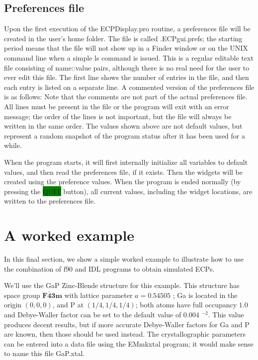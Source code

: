 \documentclass[DIV=calc, paper=letter, fontsize=11pt]{scrartcl}	 %
\newcommand{\button}[1]{\colorbox{green}{\textsf{#1}} button}
\begin{document}
\subsection{Preferences file\label{sec:idlpref}}
Upon the first execution of the \textsf{ECPDisplay.pro} routine, a preferences file will be created in the user's home folder.  
The file is called \textsf{.ECPgui.prefs}; the starting period
means that the file will not show up in a Finder window or on the UNIX command line when a simple \textsf{ls} command is issued.  This is a 
regular editable text file consisting of name::value pairs, although there is no real
need for the user to ever edit this file.  The first line shows the number of entries in the file, and then each entry is listed on a 
separate line.  A commented version of the preferences file is as follows:
Note that the comments are not part of the actual preferences file.  All lines must be present in the file or the program will exit with an error message; the order 
of the lines is not important, but the file will always be written in the same order.
The values shown above are not default values, but represent a random snapshot of the program status after it has been used for a while.

When the program starts, it will first internally initialize all variables to default values, and then read the preferences
file, if it exists.  Then the widgets will be created using the preference values.  When the program is ended normally (by
pressing the \button{QUIT}), all current values, including the widget locations, are written to the preferences
file.

\section{A worked example\label{sec:examples}}
In this final section, we show a simple worked example to illustrate how to use the combination of f90 and IDL programs 
to obtain simulated ECPs.  

We'll use the GaP Zinc-Blende structure for this example.  This structure has space group $\mathbf{F\bar{4}3m}$ with lattice parameter
$a=0.54505$ \nano\meter; Ga is located in the origin $(0,0,0)$, and P at $(1/4,1/4,1/4)$; both atoms have full occupancy $1.0$
and Debye-Waller factor can be set to the default value of $0.004$ \nano\meter$^{-2}$.  This value produces decent results, but 
if more accurate Debye-Waller factors for Ga and P are known, then those should be used instead.  The crystallographic parameters
can be entered into a data file using the \textsf{EMmkxtal} program; it would make sense to name this file \textsf{GaP.xtal}.
\end{document}
